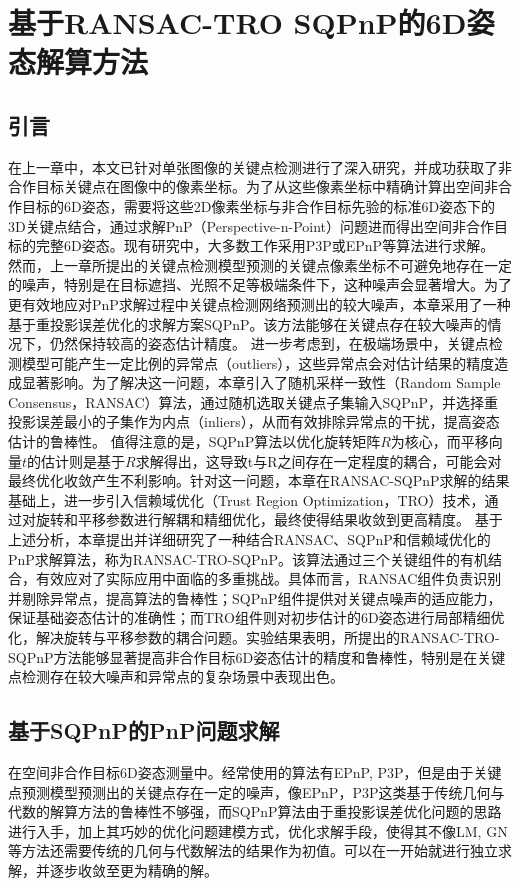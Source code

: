 \chapter{基于RANSAC-TRO SQPnP的6D姿态解算方法}
\label{chap:RANSAC-TRO-SQPnP}

\section{引言}
\label{sec:RANSAC-TRO-SQPnP:intro}
在上一章中，本文已针对单张图像的关键点检测进行了深入研究，并成功获取了非合作目标关键点在图像中的像素坐标。为了从这些像素坐标中精确计算出空间非合作目标的6D姿态，需要将这些2D像素坐标与非合作目标先验的标准6D姿态下的3D关键点结合，通过求解PnP（Perspective-n-Point）问题进而得出空间非合作目标的完整6D姿态。现有研究中，大多数工作采用P3P\cite{chen2019satellite,s22218541,Guo_2022}或EPnP\cite{li2022learning,huan2020pose,lotti2022investigating}等算法进行求解。
然而，上一章所提出的关键点检测模型预测的关键点像素坐标不可避免地存在一定的噪声，特别是在目标遮挡、光照不足等极端条件下，这种噪声会显著增大。为了更有效地应对PnP求解过程中关键点检测网络预测出的较大噪声，本章采用了一种基于重投影误差优化的求解方案SQPnP\cite{terzakis2020consistently}。该方法能够在关键点存在较大噪声的情况下，仍然保持较高的姿态估计精度。
进一步考虑到，在极端场景中，关键点检测模型可能产生一定比例的异常点（outliers），这些异常点会对估计结果的精度造成显著影响。为了解决这一问题，本章引入了随机采样一致性（Random Sample Consensus，RANSAC）算法，通过随机选取关键点子集输入SQPnP，并选择重投影误差最小的子集作为内点（inliers），从而有效排除异常点的干扰，提高姿态估计的鲁棒性。
值得注意的是，SQPnP算法以优化旋转矩阵$R$为核心，而平移向量$t$的估计则是基于$R$求解得出，这导致t与R之间存在一定程度的耦合，可能会对最终优化收敛产生不利影响。针对这一问题，本章在RANSAC-SQPnP求解的结果基础上，进一步引入信赖域优化（Trust Region Optimization，TRO）技术，通过对旋转和平移参数进行解耦和精细优化，最终使得结果收敛到更高精度。
基于上述分析，本章提出并详细研究了一种结合RANSAC、SQPnP和信赖域优化的PnP求解算法，称为RANSAC-TRO-SQPnP。该算法通过三个关键组件的有机结合，有效应对了实际应用中面临的多重挑战。具体而言，RANSAC组件负责识别并剔除异常点，提高算法的鲁棒性；SQPnP组件提供对关键点噪声的适应能力，保证基础姿态估计的准确性；而TRO组件则对初步估计的6D姿态进行局部精细优化，解决旋转与平移参数的耦合问题。实验结果表明，所提出的RANSAC-TRO-SQPnP方法能够显著提高非合作目标6D姿态估计的精度和鲁棒性，特别是在关键点检测存在较大噪声和异常点的复杂场景中表现出色。


\section{基于SQPnP的PnP问题求解}
\label{sec:RANSAC-TRO-SQPnP:SQPnP}
在空间非合作目标6D姿态测量中。经常使用的算法有EPnP, P3P，但是由于关键点预测模型预测出的关键点存在一定的噪声，像EPnP，P3P这类基于传统几何与代数的解算方法的鲁棒性不够强，而SQPnP算法\cite{terzakis2020consistently}由于重投影误差优化问题的思路进行入手，加上其巧妙的优化问题建模方式，优化求解手段，使得其不像LM, GN等方法还需要传统的几何与代数解法的结果作为初值。可以在一开始就进行独立求解，并逐步收敛至更为精确的解。
